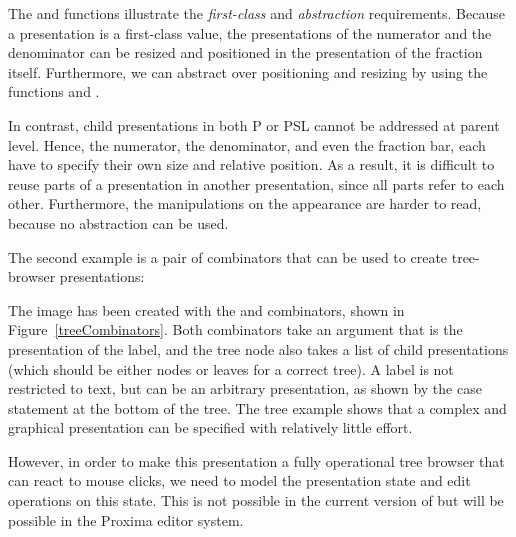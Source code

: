 The  and  functions illustrate the {\em first-class} and {\em abstraction} requirements. Because a presentation is a first-class value, the presentations of the numerator and the denominator can be resized and positioned in the presentation of the fraction itself. Furthermore, we can abstract over positioning and resizing by using the functions  and . 

In contrast, child presentations in both P or PSL cannot be addressed at parent level. Hence, the numerator, the denominator, and even the fraction bar, each have to specify their own size and relative position. As a result, it is difficult to reuse parts of a presentation in another presentation, since all parts refer to each other. Furthermore,  the manipulations on the appearance are harder to read, because no abstraction can be used. 


The second example is a pair of combinators that can be used to create tree-browser presentations:

\begin{center}
\end{center}


The image has been created with the  and  combinators, shown in Figure~\ref{treeCombinators}. Both combinators take an  argument that is the presentation of the label, and the tree node also takes a list of child presentations (which should be either nodes or leaves for a correct tree). A label is not restricted to text, but can be an arbitrary {\Xprez} presentation, as shown by the case statement at the bottom of the tree. The tree example shows that a complex and graphical presentation can be specified with relatively little effort.

\bc However, in order to make this presentation a fully operational tree browser that can react to mouse clicks, we need to model the presentation state and edit operations on this state. This is not possible in the current version of {\Xprez} but will be possible in the Proxima editor system.
\ec

